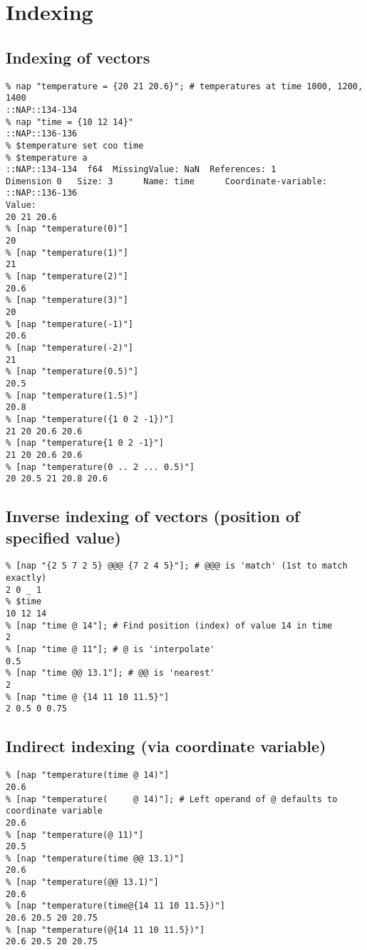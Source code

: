 
\section{Indexing}

\subsection{Indexing of vectors}

    \begin{verbatim}
% nap "temperature = {20 21 20.6}"; # temperatures at time 1000, 1200, 1400
::NAP::134-134
% nap "time = {10 12 14}"
::NAP::136-136
% $temperature set coo time
% $temperature a
::NAP::134-134  f64  MissingValue: NaN  References: 1
Dimension 0   Size: 3      Name: time      Coordinate-variable: ::NAP::136-136
Value:
20 21 20.6
% [nap "temperature(0)"]
20
% [nap "temperature(1)"]
21
% [nap "temperature(2)"]
20.6
% [nap "temperature(3)"]
20
% [nap "temperature(-1)"]
20.6
% [nap "temperature(-2)"]
21
% [nap "temperature(0.5)"]
20.5
% [nap "temperature(1.5)"]
20.8
% [nap "temperature({1 0 2 -1})"]
21 20 20.6 20.6
% [nap "temperature{1 0 2 -1}"]
21 20 20.6 20.6
% [nap "temperature(0 .. 2 ... 0.5)"]
20 20.5 21 20.8 20.6
\end{verbatim}

\subsection{Inverse indexing of vectors (position of specified value)}

    \begin{verbatim}
% [nap "{2 5 7 2 5} @@@ {7 2 4 5}"]; # @@@ is 'match' (1st to match exactly)
2 0 _ 1
% $time
10 12 14
% [nap "time @ 14"]; # Find position (index) of value 14 in time
2
% [nap "time @ 11"]; # @ is 'interpolate'
0.5
% [nap "time @@ 13.1"]; # @@ is 'nearest'
2
% [nap "time @ {14 11 10 11.5}"]
2 0.5 0 0.75
\end{verbatim}

\subsection{Indirect indexing (via coordinate variable)}

    \begin{verbatim}
% [nap "temperature(time @ 14)"]
20.6
% [nap "temperature(     @ 14)"]; # Left operand of @ defaults to coordinate variable
20.6
% [nap "temperature(@ 11)"]
20.5
% [nap "temperature(time @@ 13.1)"]
20.6
% [nap "temperature(@@ 13.1)"]
20.6
% [nap "temperature(time@{14 11 10 11.5})"]
20.6 20.5 20 20.75
% [nap "temperature(@{14 11 10 11.5})"]
20.6 20.5 20 20.75
\end{verbatim}

